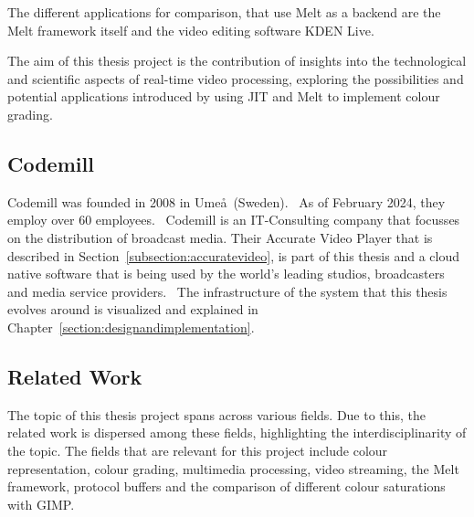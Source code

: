 \documentclass[../MasterThesis.tex]{subfiles}
\begin{document}
	The different applications for comparison, that use Melt as a backend are the Melt framework itself and the video editing software KDEN Live. 
	
	
	The aim of this thesis project is the contribution of insights into the technological and scientific aspects of real-time video processing, exploring the possibilities and potential applications introduced by using JIT and Melt to implement colour grading. 
	
	
	
	
	
	
\newpage	
	\subsection{Codemill} \label{subsection:codemill}
	
	Codemill was founded in 2008 in Ume\aa \ (Sweden).~\cite{codemill_now, codemill_old, codemill_linkedin}
	As of February 2024, they employ over 60 employees.~\cite{codemill} 
	Codemill is an IT-Consulting company that focusses on the distribution of broadcast media. Their Accurate Video Player that is described in Section~\ref{subsection:accuratevideo}, is part of this thesis and a cloud native software that is being used by the world's leading studios, broadcasters and media service providers.~\cite{codemill_linkedin, codemill_avp}
	The infrastructure of the system that this thesis evolves around is visualized and explained in Chapter~\ref{section:designandimplementation}.
	
	
	
	
	
	
	
	
	
	
	
	
	\subsection{Related Work} \label{subsection:relatedwork}
	
	The topic of this thesis project spans across various fields. 
	Due to this, the related work is dispersed among these fields, highlighting the interdisciplinarity of the topic.
	The fields that are relevant for this project include colour representation, colour grading, multimedia processing, video streaming, the Melt framework, protocol buffers and the comparison of different colour saturations with GIMP.
\end{document}
